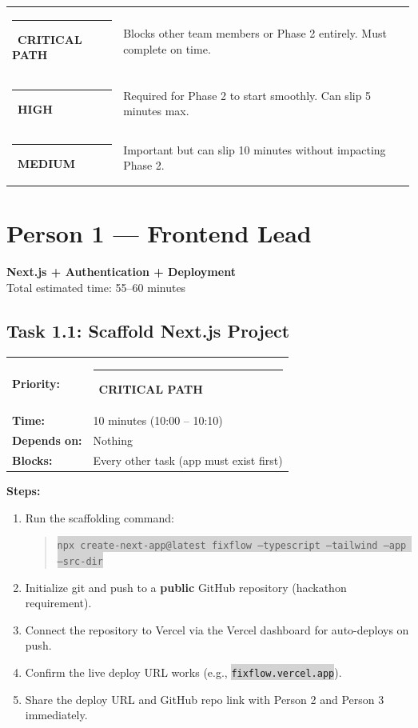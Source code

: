 \documentclass[11pt, a4paper]{article}
\newcommand{\critical}{\textcolor{critred}{\rule{6pt}{6pt}}~\textcolor{critred}{\scriptsize\textbf{CRITICAL PATH}}}
\newcommand{\highpri}{\textcolor{highamber}{\rule{6pt}{6pt}}~\textcolor{highamber}{\scriptsize\textbf{HIGH}}}
\newcommand{\medpri}{\textcolor{medgreen}{\rule{6pt}{6pt}}~\textcolor{medgreen}{\scriptsize\textbf{MEDIUM}}}
\newcommand{\code}[1]{\texttt{\small\colorbox{lightgray}{#1}}}
\begin{document}
\begin{tabularx}{\textwidth}{lX}
\critical & Blocks other team members or Phase 2 entirely. Must complete on time. \\[4pt]
\highpri & Required for Phase 2 to start smoothly. Can slip 5 minutes max. \\[4pt]
\medpri & Important but can slip 10 minutes without impacting Phase 2. \\
\end{tabularx}

\newpage

\section{Person 1 --- Frontend Lead}
\begin{center}
\textcolor{medblue}{\large\textbf{Next.js + Authentication + Deployment}}\\[2pt]
\textcolor{textmuted}{\small Total estimated time: 55--60 minutes}
\end{center}

\vspace{0.5em}

\subsection{Task 1.1: Scaffold Next.js Project}

\begin{tabularx}{\textwidth}{lX}
\textbf{Priority:} & \critical \\
\textbf{Time:} & 10 minutes (10:00 -- 10:10) \\
\textbf{Depends on:} & Nothing \\
\textbf{Blocks:} & Every other task (app must exist first) \\
\end{tabularx}

\vspace{0.3em}

\textbf{Steps:}
\begin{enumerate}[leftmargin=2em, itemsep=2pt]
  \item Run the scaffolding command:
    \begin{quote}\code{npx create-next-app@latest fixflow --typescript --tailwind --app --src-dir}\end{quote}
  \item Initialize git and push to a \textbf{public} GitHub repository (hackathon requirement).
  \item Connect the repository to Vercel via the Vercel dashboard for auto-deploys on push.
  \item Confirm the live deploy URL works (e.g., \code{fixflow.vercel.app}).
  \item Share the deploy URL and GitHub repo link with Person 2 and Person 3 immediately.
\end{enumerate}
\end{document}

